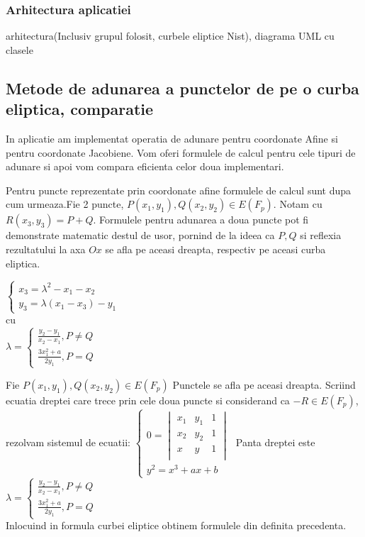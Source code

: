 \subsubsection{Arhitectura aplicatiei}
\label{sec:sec01}
arhitectura(Inclusiv grupul folosit, curbele eliptice Nist), diagrama UML cu clasele

\subsection{Metode de adunarea a punctelor de pe o curba eliptica, comparatie}
\label{subsec:subsec02}
In aplicatie am implementat operatia de adunare pentru coordonate Afine si pentru coordonate Jacobiene. Vom oferi formulele de calcul pentru cele tipuri de adunare si apoi vom compara eficienta celor doua implementari.
\begin{dfn}
Pentru puncte reprezentate prin coordonate afine formulele de calcul sunt dupa cum urmeaza.Fie 2 puncte, $P(x_{1}, y_1), Q(x_2, y_2)\in E(F_p)$. Notam cu $R(x_3, y_3) = P + Q$. Formulele pentru adunarea a doua puncte pot fi demonstrate matematic destul de usor, pornind de la ideea ca $P, Q$ si reflexia rezultatului la axa $Ox$ se afla pe aceasi dreapta, respectiv pe aceasi curba eliptica.

$\begin{cases} 
    x_3 = \lambda^2 - x_1 - x_2 \\
    y_3 =  \lambda (x_1-x_3) - y_1
   \end{cases}$
 \\cu 
 \\$
 \lambda = 
 \begin{cases}
 \frac{y_2 - y_1}{x_2 - x_1}, P \neq Q \\ 
 \frac{3x^{2}_1 + a}{2y_1}, P = Q
 \end{cases}$ \\
\end{dfn}

\begin{dem}
Fie $P(x_1, y_1), Q(x_2, y_2)\in E(F_p)$ Punctele se afla pe aceasi dreapta. Scriind ecuatia dreptei care trece prin cele doua puncte si considerand ca $-R\in E(F_p)$, rezolvam sistemul de ecuatii:
$\begin{cases} 
    0 = \begin{vmatrix}
			x_1 & y_1 & 1 \\ 
			x_2 & y_2 & 1 \\ 
			x & y & 1  \\ 
			\end{vmatrix} \\
    y^2 =  x^3 + ax + b
   \end{cases}$
   Panta dreptei este $\lambda = \begin{cases}
 \frac{y_2 - y_1}{x_2 - x_1}, P \neq Q \\ 
 \frac{3x^{2}_1 + a}{2y_1}, P = Q
 \end{cases}$
 \\Inlocuind in formula curbei eliptice obtinem formulele din definita precedenta.
\end{dem}

